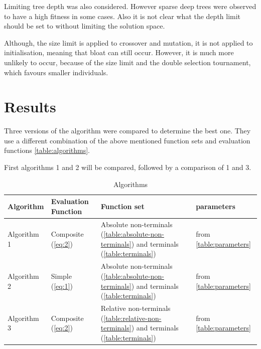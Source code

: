 \documentclass[12pt,a4paper]{article}
\begin{document}
	Limiting tree depth was also considered. However sparse deep trees were observed to have a high fitness in some cases. Also it is not clear what the depth limit should be set to without limiting the solution space. 
	
	Although, the size limit is applied to crossover  and mutation, it is not applied to initialisation, meaning that bloat can still occur. However, it is much more unlikely to occur, because of the size limit and the double selection tournament, which favours smaller individuals.

	\section{Results} \label{results}
	Three versions of the algorithm were compared to determine the best one. They use a different combination of the above mentioned function sets and evaluation functions \autoref{table:algorithms}. 
	
	First algorithms 1 and 2 will be compared, followed by a comparison of 1 and 3. 
	
		\begin{table}[h!]
			\centering
			\begin{tabu} to \textwidth {|X[1l]|X[2l]|X[2l]|X[1l]|}
				\hline
				\textbf{Algorithm} & \textbf{Evaluation Function} & \textbf{Function set} & \textbf{parameters} \\ \hline
				
				Algorithm 1  & Composite (\autoref{eq:2}) & Absolute non-terminals (\autoref{table:absolute-non-terminals}) and terminals (\autoref{table:terminals})  &  from \autoref{table:parameters}\\ \hline  
				
				Algorithm 2  & Simple (\autoref{eq:1}) & Absolute non-terminals (\autoref{table:absolute-non-terminals}) and terminals (\autoref{table:terminals})  &  from \autoref{table:parameters}\\ \hline  
				
				Algorithm 3  & Composite (\autoref{eq:2}) & Relative non-terminals (\autoref{table:relative-non-terminals}) and terminals (\autoref{table:terminals})  &  from \autoref{table:parameters}\\ \hline  
			\end{tabu}
			
			\caption{Algorithms}
			\label{table:algorithms}
		\end{table}
		
\end{document}
